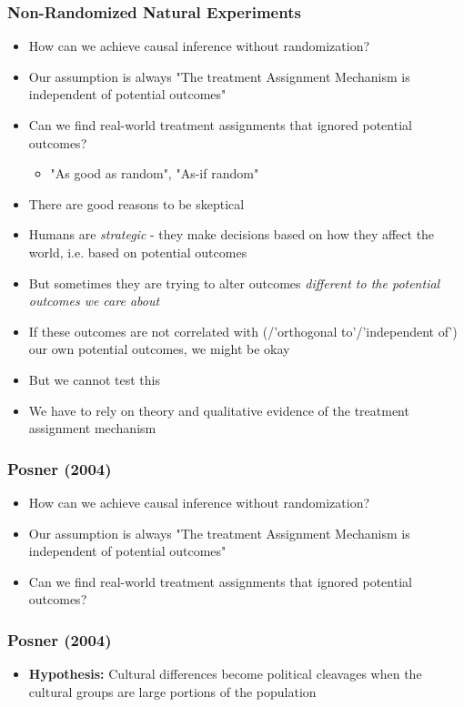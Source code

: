 \documentclass[xcolor=x11names,compress]{beamer}\usepackage[]{graphicx}\usepackage[]{color}
\renewcommand{\(}{\begin{columns}}
\renewcommand{\)}{\end{columns}}
\newcommand{\<}[1]{\begin{column}{#1}}
\renewcommand{\>}{\end{column}}
\begin{document}
\begin{frame}
\frametitle{Non-Randomized Natural Experiments}
\begin{itemize}
\item How can we achieve causal inference without randomization?
\pause
\item Our assumption is always "The treatment Assignment Mechanism is independent of potential outcomes"
\pause
\item Can we find real-world treatment assignments that ignored potential outcomes?
\begin{itemize}
\pause
\item "As good as random", "As-if random"
\end{itemize}
\item There are good reasons to be skeptical
\pause
\item Humans are \textit{strategic} - they make decisions based on how they affect the world, i.e. based on potential outcomes
\pause
\item But sometimes they are trying to alter outcomes \textit{different to the potential outcomes we care about}
\pause
\item If these outcomes are not correlated with (/'orthogonal to'/'independent of') our own potential outcomes, we might be okay
\pause
\item But we cannot test this
\pause
\item We have to rely on theory and qualitative evidence of the treatment assignment mechanism
\end{itemize}
\end{frame}

\begin{frame}
\frametitle{Posner (2004)}
\begin{itemize}
\item How can we achieve causal inference without randomization?
\pause
\item Our assumption is always "The treatment Assignment Mechanism is independent of potential outcomes"
\pause
\item Can we find real-world treatment assignments that ignored potential outcomes?
\end{itemize}
\end{frame}

\begin{frame}
\frametitle{Posner (2004)}
\begin{itemize}
\item \textbf{Hypothesis:} Cultural differences become political cleavages when the cultural groups are large portions of the population
\end{itemize}
\end{frame}
\end{document}
